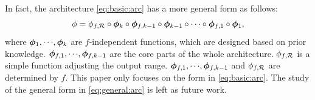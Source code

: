 \documentclass[nohyperref]{article}
\def\bmphiin{\bmphi_{\tn{in}}}
\def\phiout{\phi_{\tn{out}}}
\theoremstyle{plain}
\theoremstyle{definition}
\theoremstyle{remark}
\begin{document}
In fact, the architecture \eqref{eq:basic:arc} has a more general form as follows:
\begin{equation}\label{eq:general:arc}
	\phi = \phi_{f,\calR}\circ\bmphi_k\circ\bmphi_{f,k-1}\circ\bmphi_{k-1}\circ\cdots\circ\bmphi_{f,1}\circ\bmphi_{1},
\end{equation}
where $\bmphi_1,\cdots,\bmphi_k$ are $f$-independent functions, which are designed based on prior knowledge. $\bmphi_{f,1},\cdots,\bmphi_{f,k-1}$ are the core parts of the whole architecture. $\phi_{f,{\mathcal{R}}}$ is a simple function adjusting the output range. $\bmphi_{f,1},\cdots,\bmphi_{f,k-1}$ and $\phi_{f,{\mathcal{R}}}$ are determined by $f$.
This paper only focuses on the form in \eqref{eq:basic:arc}. The study of the general form in \eqref{eq:general:arc} is left as future work.



%
\end{document}
